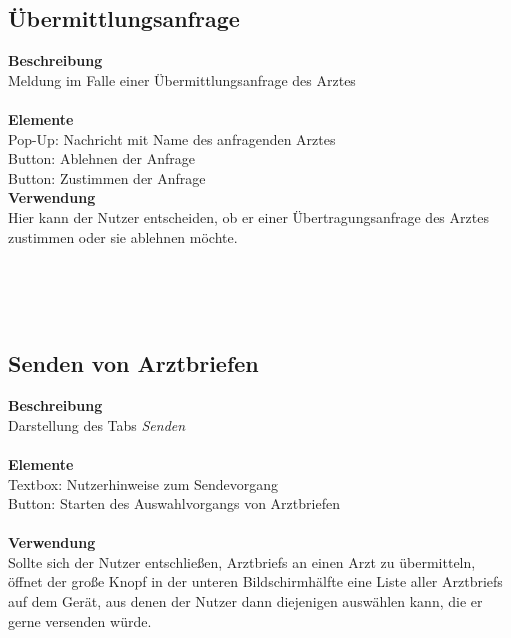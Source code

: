 \documentclass[a4paper]{scrreprt}
\begin{document}
\begin{minipage}[t][][b]{0.65\textwidth}
\subsection*{Übermittlungsanfrage}
\textbf{Beschreibung}\\
{Meldung im Falle einer Übermittlungsanfrage des Arztes}\\
~\\
\textbf{Elemente}\\
{\gls{Pop-Up}: Nachricht mit Name des anfragenden Arztes}\\
{Button: Ablehnen der Anfrage}\\
{Button: Zustimmen der Anfrage}\\

\textbf{Verwendung}\\
{Hier kann der \gls{Nutzer} entscheiden, ob er einer Übertragungsanfrage des Arztes zustimmen oder sie ablehnen möchte.}

~\\
~\\
~\\

\subsection*{Senden von Arztbriefen}
\textbf{Beschreibung}\\
{Darstellung des Tabs \textit{Senden}}\\
~\\
\textbf{Elemente}\\
{Textbox: Nutzerhinweise zum Sendevorgang}\\
{Button: Starten des Auswahlvorgangs von Arztbriefen}\\
~\\
\textbf{Verwendung}\\
{Sollte sich der \gls{Nutzer} entschließen, \glspl{Arztbrief} an einen Arzt zu übermitteln, öffnet der große Knopf in der unteren Bildschirmhälfte eine Liste aller \glspl{Arztbrief} auf dem Gerät, aus denen der \gls{Nutzer} dann diejenigen auswählen kann, die er gerne versenden würde.}
\end{minipage}%



\newpage
\end{document}
